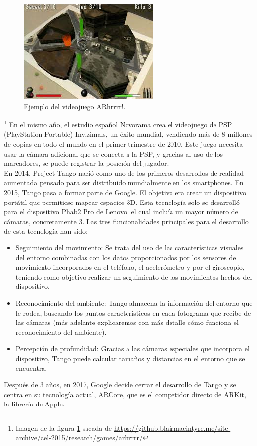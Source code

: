 \begin{figure}[H]
    \centering
        \includegraphics[width=0.5\linewidth]{Images/Arrrr.jpeg}
        \caption{Ejemplo del videojuego ARhrrrr!.}
        \label{fig:arhrrrr}
  \end{figure}
{\let\thefootnote\relax\footnote{{Imagen de la figura \ref{fig:arhrrrr} sacada de \url{https://github.blairmacintyre.me/site-archive/ael-2015/research/games/arhrrrr/}}}}
En el mismo año, el estudio español Novorama crea el videojuego de PSP (PlayStation Portable) Invizimals, un éxito mundial, vendiendo más de 8 millones de copias en todo el mundo en el primer trimestre de 2010. Este juego necesita usar la cámara adicional que se conecta a la PSP, y gracias al uso de los marcadores, se puede registrar la posición del jugador.\\

En 2014, Project Tango nació como uno de los primeros desarrollos de realidad aumentada pensado para ser distribuido mundialmente en los smartphones. En 2015, Tango pasa a formar parte de Google. El objetivo era crear un dispositivo portátil que permitiese mapear espacios 3D. Esta tecnología solo se desarrolló para el dispositivo Phab2 Pro de Lenovo, el cual incluía un mayor número de cámaras, concretamente 3.
Las tres funcionalidades principales para el desarrollo de esta tecnología han sido:
\begin{itemize}
\item Seguimiento del movimiento: Se trata del uso de las características visuales del entorno combinadas con los datos proporcionados por los sensores de movimiento incorporados en el teléfono, el acelerómetro y por el giroscopio, teniendo como objetivo realizar un seguimiento de los movimientos hechos del dispositivo. 
\item Reconocimiento del ambiente: Tango almacena la información del entorno que le rodea, buscando los puntos característicos en cada fotograma que recibe de las cámaras (más adelante explicaremos con más detalle cómo funciona el reconocimiento del ambiente).
\item Percepción de profundidad: Gracias a las cámaras especiales que incorpora el dispositivo, Tango puede calcular tamaños y distancias en el entorno que se encuentra. 
\end{itemize}
Después de 3 años, en 2017, Google decide cerrar el desarrollo de Tango y se centra en su tecnología actual, ARCore, que es el competidor directo de ARKit, la librería de Apple.

